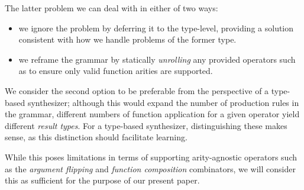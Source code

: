 \documentclass{article}
\begin{document}
The latter problem we can deal with in either of two ways:
\begin{itemize}
    \item we ignore the problem by deferring it to the type-level,
    providing a solution consistent with how we handle problems of the former type.
    \item we reframe the grammar by statically \emph{unrolling} any provided operators such as to ensure only valid function arities are supported.
\end{itemize}

We consider the second option to be preferable from the perspective of a type-based synthesizer;
although this would expand the number of production rules in the grammar,
different numbers of function application for a given operator yield different \emph{result types}.
For a type-based synthesizer, distinguishing these makes sense,
as this distinction should facilitate learning.%



    While this poses limitations in terms of supporting arity-agnostic operators
    such as the \emph{argument flipping} and \emph{function composition} combinators,
    we will consider this as sufficient for the purpose of our present paper.
\end{document}
